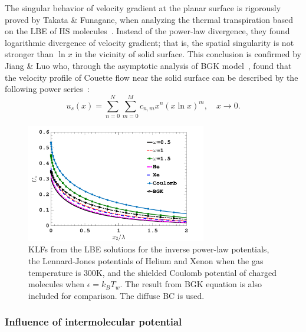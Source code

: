 
The singular behavior of velocity gradient at the planar surface is rigorously proved by Takata \& Funagane, when analyzing the thermal transpiration based on the LBE of HS molecules~\cite{takata2013singular}. Instead of the power-law divergence, they found logarithmic divergence of velocity gradient; that is, the spatial singularity is not stronger than $\ln{}x$ in the vicinity of solid surface. This conclusion is confirmed by Jiang \& Luo who, through the asymptotic analysis of BGK  model~\cite{bhatnagar1954model}, found that the velocity profile of Couette flow near the solid surface can be described by the following power series~\cite{lilley2007velocity,lilley2008velocity}:
\begin{equation}\label{eq:vel_fit}
u_s(x)=\sum_{n=0}^{N}\sum_{m=0}^{M}c_{n,m}x^n(x\ln{x})^m, \quad{} x\rightarrow0. %
\end{equation}

\begin{figure}[t]
	\centering
	\includegraphics[width=0.7\textwidth]{SlipJump/IMG/vel_def_omega}
	\caption{ KLFs from the LBE solutions for the inverse power-law potentials, the Lennard-Jones potentials of Helium and Xenon when the gas temperature is $300$K, and the shielded Coulomb potential of charged molecules when $\epsilon=k_BT_w$. The result from BGK equation is also included for comparison. The diffuse BC is used.  }
	\label{fig:vel_def_omega}
\end{figure}





\subsubsection{Influence of intermolecular potential}


